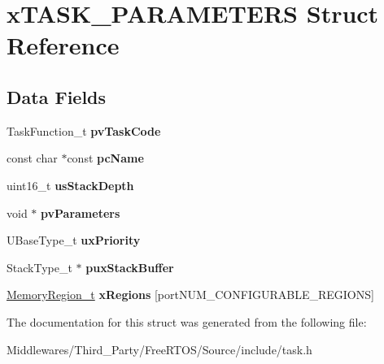 \hypertarget{structx_t_a_s_k___p_a_r_a_m_e_t_e_r_s}{}\section{x\+T\+A\+S\+K\+\_\+\+P\+A\+R\+A\+M\+E\+T\+E\+RS Struct Reference}
\label{structx_t_a_s_k___p_a_r_a_m_e_t_e_r_s}
\subsection*{Data Fields}
\begin{DoxyCompactItemize}
\item 
\mbox{\label{structx_t_a_s_k___p_a_r_a_m_e_t_e_r_s_a06aee8b42bc6c569b62ab3cdc4abf8b0}} 
Task\+Function\+\_\+t {\bfseries pv\+Task\+Code}
\item 
\mbox{\label{structx_t_a_s_k___p_a_r_a_m_e_t_e_r_s_a2de8afaf668518af9982627791b2cc23}} 
const char $\ast$const {\bfseries pc\+Name}
\item 
\mbox{\label{structx_t_a_s_k___p_a_r_a_m_e_t_e_r_s_aae6fa1f3cc5f8b931225ed4b454f3865}} 
uint16\+\_\+t {\bfseries us\+Stack\+Depth}
\item 
\mbox{\label{structx_t_a_s_k___p_a_r_a_m_e_t_e_r_s_a308cef200968d514395c0272c061d3ec}} 
void $\ast$ {\bfseries pv\+Parameters}
\item 
\mbox{\label{structx_t_a_s_k___p_a_r_a_m_e_t_e_r_s_a0befed3dd0fe55b4314158f4814f50ae}} 
U\+Base\+Type\+\_\+t {\bfseries ux\+Priority}
\item 
\mbox{\label{structx_t_a_s_k___p_a_r_a_m_e_t_e_r_s_a3f80c2175bac00298ba9a17ddd50e29d}} 
Stack\+Type\+\_\+t $\ast$ {\bfseries pux\+Stack\+Buffer}
\item 
\mbox{\label{structx_t_a_s_k___p_a_r_a_m_e_t_e_r_s_a7bc9c069ce3a5e929c7ef29e95184584}} 
\mbox{\hyperlink{structx_m_e_m_o_r_y___r_e_g_i_o_n}{Memory\+Region\+\_\+t}} {\bfseries x\+Regions} \mbox{[}port\+N\+U\+M\+\_\+\+C\+O\+N\+F\+I\+G\+U\+R\+A\+B\+L\+E\+\_\+\+R\+E\+G\+I\+O\+NS\mbox{]}
\end{DoxyCompactItemize}


The documentation for this struct was generated from the following file\+:\begin{DoxyCompactItemize}
\item 
Middlewares/\+Third\+\_\+\+Party/\+Free\+R\+T\+O\+S/\+Source/include/task.\+h\end{DoxyCompactItemize}
